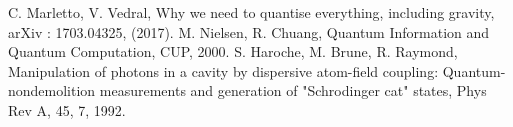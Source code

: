 \documentclass[prl,twocolumn,showpacs,preprintnumbers,amsmath,amssymb]{revtex4}
\begin{document}
\begin{thebibliography}{1}
	
		
	

	 C. Marletto, V. Vedral, Why we need to quantise everything, including gravity, arXiv : 1703.04325, (2017).
		 M. Nielsen, R. Chuang, Quantum Information and Quantum Computation,  CUP, 2000.
	 S. Haroche, M. Brune, R. Raymond, Manipulation of photons in a cavity by dispersive atom-field coupling: Quantum-nondemolition measurements and generation of "Schrodinger cat" states, Phys Rev A, 45, 7, 1992.

		

	
	
\end{thebibliography}
\end{document}
